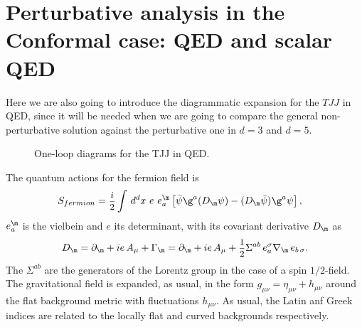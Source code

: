 \documentclass[a4paper,11pt,openright,twoside]{book}
\let\s=\sigma  \let\t=\tau     \let\u=\upsilon \let\f=\phi
\let\G=\Gamma  \let\D=\Delta \let\Q=\Theta  \let\L=\Lambda
\newcommand{\sdfrac}[2]{\mbox{\small$\displaystyle\frac{#1}{#2}$}}
\numberwithin{equation}{section}
\begin{document}
{{\section{Perturbative analysis in the Conformal case: QED and scalar QED}
\label{pchecks}
Here we are also going to introduce the diagrammatic expansion for the $TJJ$ in QED, since it will be needed when we are going to compare the general non-perturbative solution against the perturbative one in $d=3$ and $d=5$. \\
\begin{figure}[t]
	\centering
	\vspace{-1.3cm}
	 \hspace{.3cm}
	 \hspace{.3cm}
	\hspace{.3cm}	
	\vspace{-0.8cm}\caption{One-loop diagrams for the TJJ in QED. \label{Figura1}}
\end{figure}
The quantum actions for the fermion field is
\begin{align}
	S_{fermion}&=\sdfrac{i}{2}\int\, d^dx\ e\ e^{\m}_a\left[\bar{\psi}\g^a(D_\m\psi)-(D_\m\bar{\psi})\g^a\psi\right],
\end{align}
$e^\m_a$ is the vielbein and $e$ its determinant, with its covariant derivative $D_\m$ as
\begin{equation}
	D_\m=\partial_\m+ie\,A_\mu+\G_\m=\partial_\m+ie\,A_\mu+\sdfrac{1}{2}\Sigma^{ab}\,e^\s_a\nabla_\m\,e_{b\,\s}.
\end{equation}
The $\Sigma^{ab}$ are the generators of the Lorentz group in the case of a spin $1/2$-field. The gravitational field is expanded, as usual, in the form $g_{\mu\nu}=\eta_{\mu\nu} + h_{\mu\nu}$ around the flat background metric with fluctuations $h_{\mu\nu}$. As usual, the Latin anf Greek indices are related to the locally flat and curved backgrounds respectively.

}}
\end{document}
